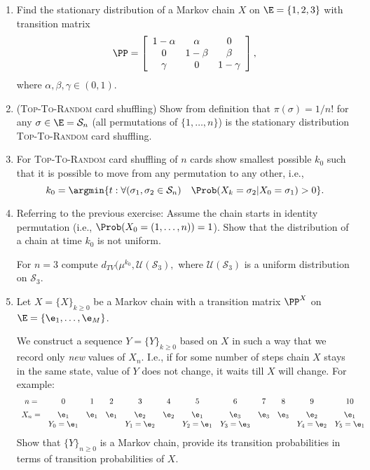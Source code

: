 \documentclass[a4paper,12pt]{article}
\begin{document}
\begin{enumerate}
\item
Find the stationary distribution of a Markov chain $X$ on  $\E=\{1,2,3\}$ with transition matrix
$$\PP=\left[
\begin{array}{ccccccccc}
1-\alpha & \alpha & 0 \\
0  &1-\beta &\beta  \\
\gamma&0&1-\gamma\\
    \end{array}\right],$$
where $\alpha,\beta,\gamma\in(0,1)$.

\item(\textsc{Top-To-Random} card shuffling) Show from definition that 
$\pi(\sigma)={1/n!}$ for any $\sigma\in\E=\mathcal{S}_n$ (all permutations of $\{1,\ldots,n\}$) 
is the stationary distribution \textsc{Top-To-Random} card shuffling.

\item
For \textsc{Top-To-Random} card shuffling of $n$ cards show smallest possible $k_0$ such that
it is possible to move from any permutation to any other, i.e.,
$$k_0=\argmin\{t:   \forall (\sigma_1,\sigma_2 \in\mathcal{S}_n)\quad  \Prob(X_k=\sigma_2 | X_0=\sigma_1)>0\}.$$
% 

\item 
Referring to the previous exercise: Assume the chain starts in identity permutation
(i.e., $\Prob(X_0=(1,\ldots,n))=1$). Show that the distribution of a chain at time $k_0$ is not uniform.

For  $n=3$ compute  $d_{TV}(\mu^{k_0},\mathcal{U}(\mathcal{S}_3),$ where 
$\mathcal{U}(\mathcal{S}_3)$ is a uniform distribution on $\mathcal{S}_3$.

\item
Let $X=\{X\}_{k\geq 0}$ be a Markov chain with a transition matrix $\PP^X$ on $\E=\{\e_1,\ldots,\e_M\}$.

We construct a sequence $Y=\{Y\}_{k\geq 0}$ based on $X$ in such a way that we record only 
\textsl{new} values of $X_n$.
I.e., if for some number of steps chain $X$ stays in the same state, value of $Y$ does not change,
it waits till $X$ will change. For example:
$$
\begin{array}{ccccccccccccccccccccccc}
 n = & 0 & 1 & 2 & 3 & 4 & 5 & 6 & 7 & 8 & 9 & 10\\[5pt]
 X_n = &\e_1 & \e_1 &\e_1 & \e_2 &\e_2 & \e_1 & \e_3& \e_3& \e_3& \e_2 &\e_1\\
 & Y_0=\e_1& & & Y_1=\e_2 & & Y_2=\e_1 & Y_3=\e_3& & & Y_4=\e_2 & Y_5=\e_1\\
\end{array}
$$
Show that $\{Y\}_{n\geq 0}$ is a Markov chain, provide its transition probabilities in terms 
of transition probabilities of $X$.


\end{enumerate}
\end{document}
